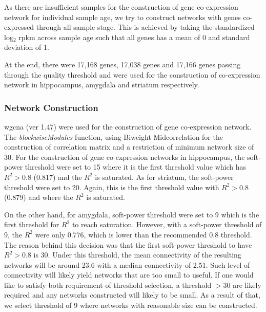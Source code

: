 As there are insufficient samples for the construction of gene co-expression network for individual sample age, we try to construct networks with genes co-expressed through all sample stage. 
This is achieved by taking the standardized log$_2$ \gls{rpkm} across sample age such that all genes has a mean of 0 and standard deviation of 1.

At the end, there were 17,168 genes, 17,038 genes and 17,166 genes passing through the quality threshold and were used for the construction of co-expression network in hippocampus, amygdala and striatum respectively. 

\subsubsection{Network Construction}
\gls{wgcna} (ver 1.47) were used for the construction of gene co-expression network\citep{Langfelder2008}. 
The \emph{blockwiseModules} function, using Biweight Midcorrelation for the construction of correlation matrix and a restriction of minimum network size of 30. 
For the construction of gene co-expression networks in hippocampus, the soft-power threshold were set to 15 where it is the first threshold value which has $R^2 > 0.8$ (0.817) and the $R^2$ is saturated\citep{Zhang2005}.%
As for striatum, the soft-power threshold were set to 20. 
Again, this is the first threshold value with $R^2 >0.8$ (0.879) and where the $R^2$ is saturated.

On the other hand, for amygdala, soft-power threshold were set to 9 which is the first threshold for $R^2$ to reach saturation. 
However, with a soft-power threshold of 9, the $R^2$ were only 0.776, which is lower than the recommended 0.8 threshold.
The reason behind this decision was that the first soft-power threshold to have $R^2 > 0.8$ is 30.
Under this threshold, the mean connectivity of the resulting networks will be around 23.6 with a median connectivity of 2.51.
Such level of connectivity will likely yield networks that are too small to useful.
If one would like to satisfy both requirement of threshold selection, a threshold $>30$ are likely required and any networks constructed will likely to be small.
As a result of that, we select threshold of 9 where networks with reasonable size can be constructed.


